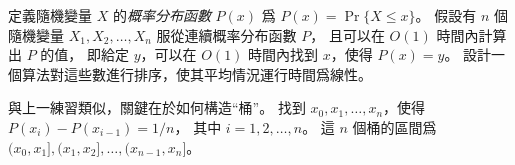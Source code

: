 \startEXERCISE\DIFFICULT
定義隨機變量 $X$ 的\emph{概率分布函數} $P(x)$ 爲 $P(x)=\Pr\{X\le x\}$。
假設有 $n$ 個隨機變量 $X_1,X_2,\ldots,X_n$ 服從連續概率分布函數 $P$，
且可以在 $O(1)$ 時間內計算出 $P$ 的值，
即給定 $y$，可以在 $O(1)$ 時間內找到 $x$，使得 $P(x)=y$。
設計一個算法對這些數進行排序，使其平均情況運行時間爲線性。
\stopEXERCISE

\startANSWER
與上一練習類似，關鍵在於如何構造“桶”。
找到 $x_0,x_1,\ldots,x_n$，使得 $P(x_i)-P(x_{i-1}) = 1/n$，
其中 $i=1,2,\ldots,n$。
這 $n$ 個桶的區間爲 $(x_0,x_1],(x_1,x_2],\ldots,(x_{n-1},x_n]$。
\stopANSWER
